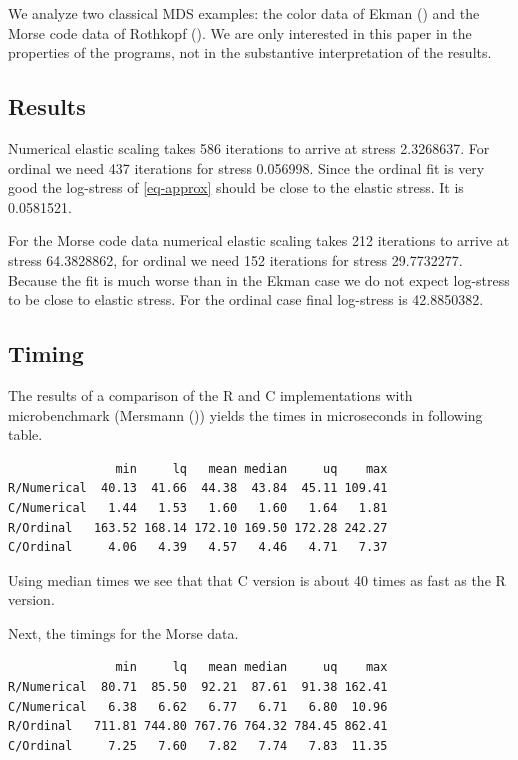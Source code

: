\documentclass[
  12pt,
  letterpaper,
  DIV=11,
  numbers=noendperiod]{scrartcl}
\begin{document}
We analyze two classical MDS examples: the color data of Ekman
() and the Morse code data of Rothkopf
(). We are only interested in this paper
in the properties of the programs, not in the substantive interpretation
of the results.

\subsection{Results}\label{results}

Numerical elastic scaling takes 586 iterations to arrive at stress
2.3268637. For ordinal we need 437 iterations for stress 0.056998. Since
the ordinal fit is very good the log-stress of \eqref{eq-approx} should
be close to the elastic stress. It is 0.0581521.

For the Morse code data numerical elastic scaling takes 212 iterations
to arrive at stress 64.3828862, for ordinal we need 152 iterations for
stress 29.7732277. Because the fit is much worse than in the Ekman case
we do not expect log-stress to be close to elastic stress. For the
ordinal case final log-stress is 42.8850382.

\subsection{Timing}\label{timing}

The results of a comparison of the R and C implementations with
microbenchmark (Mersmann ()) yields the
times in microseconds in following table.

\begin{verbatim}
               min     lq   mean median     uq    max
R/Numerical  40.13  41.66  44.38  43.84  45.11 109.41
C/Numerical   1.44   1.53   1.60   1.60   1.64   1.81
R/Ordinal   163.52 168.14 172.10 169.50 172.28 242.27
C/Ordinal     4.06   4.39   4.57   4.46   4.71   7.37
\end{verbatim}

Using median times we see that that C version is about 40 times as fast
as the R version.

Next, the timings for the Morse data.

\begin{verbatim}
               min     lq   mean median     uq    max
R/Numerical  80.71  85.50  92.21  87.61  91.38 162.41
C/Numerical   6.38   6.62   6.77   6.71   6.80  10.96
R/Ordinal   711.81 744.80 767.76 764.32 784.45 862.41
C/Ordinal     7.25   7.60   7.82   7.74   7.83  11.35
\end{verbatim}
\end{document}
